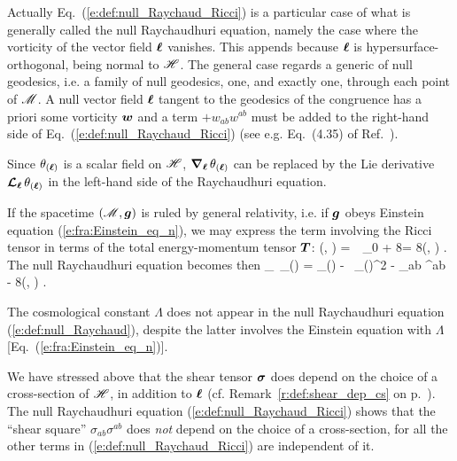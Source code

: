 \begin{remark}
Actually Eq.~(\ref{e:def:null_Raychaud_Ricci}) is a particular case of
what is generally called the null Raychaudhuri equation, namely the case where
the vorticity of the vector field $\bm{\ell}$ vanishes. This
appends because $\bm{\ell}$ is hypersurface-orthogonal, being normal to $\mathscr{H}$.
The general case regards a generic
 of null
geodesics, i.e. a family of null geodesics, one, and exactly one, through
each point of $\mathscr{M}$. A null vector field $\bm{\ell}$ tangent to the geodesics
of the congruence has a priori some vorticity $\bm{w}$ and a term
$+w_{ab} w^{ab}$ must be added to the right-hand side of
Eq.~(\ref{e:def:null_Raychaud_Ricci}) (see e.g. Eq.~(4.35) of Ref.~\cite{HawkiE73}).
\end{remark}

\begin{remark}
Since $\theta_{(\bm{\ell})}$ is a scalar field on $\mathscr{H}$, $\bm{\nabla}_{\bm{\ell}}\,  \theta_{(\bm{\ell})}$
can be replaced by the Lie derivative $\bm{\mathcal{L}}_{\bm{\bm{\ell}}}\, \theta_{(\bm{\ell})}$ in the left-hand side of the Raychaudhuri
equation.
\end{remark}

If the spacetime $(\mathscr{M},\bm{g})$ is ruled by general relativity, i.e. if
$\bm{g}$ obeys Einstein equation (\ref{e:fra:Einstein_eq_n}), we may express
the term involving the Ricci tensor in terms of the total energy-momentum tensor
$\bm{T}$:
\be \label{e:def:Rll_Tll}
  (\wl, \wl)  = \,\Lambda\,  _{0}
    + 8\pi {}
    = 8\pi {}(\wl, \wl) .
\ee
The null Raychaudhuri equation becomes then
\be \label{e:def:null_Raychaud}
     \wnab_{\wl}\,  \theta_{(\wl)} = \kappa \theta_{(\wl)}
        -  \, \theta_{(\wl)}^2 - \sigma_{ab} \sigma^{ab}
        - 8\pi {}(\wl, \wl) .
\ee


\begin{remark}
The cosmological constant $\Lambda$ does not appear in
the null Raychaudhuri equation (\ref{e:def:null_Raychaud}), despite the
latter involves the Einstein equation with $\Lambda$
[Eq.~(\ref{e:fra:Einstein_eq_n})].
\end{remark}

\begin{remark}
We have stressed above that the shear tensor $\bm{\sigma}$ does depend on
the choice of a cross-section of $\mathscr{H}$, in addition to $\bm{\ell}$
(cf. Remark~\ref{r:def:shear_dep_cs} on p.~\pageref{r:def:shear_dep_cs}).
The null Raychaudhuri equation (\ref{e:def:null_Raychaud_Ricci}) shows that
the ``shear square'' $\sigma_{ab} \sigma^{ab}$ does \emph{not} depend on the choice
of a cross-section, for all the other terms in (\ref{e:def:null_Raychaud_Ricci}) are
independent of it.
\end{remark}

